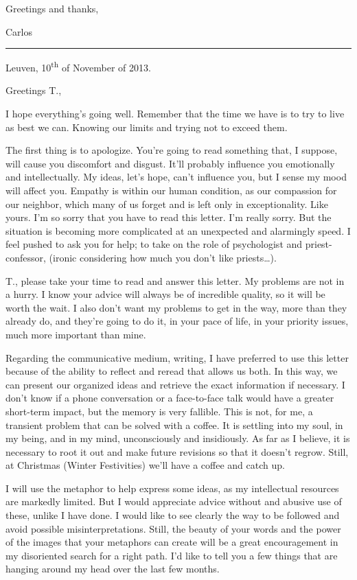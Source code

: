 \documentclass[]{book}
\begin{document}
Greetings and thanks,

Carlos

\begin{center}\rule{0.5\linewidth}{\linethickness}\end{center}

Leuven, 10\textsuperscript{th} of November of 2013.

Greetings T.,

I hope everything's going well. Remember that the time we have is to try to live as best we can. Knowing our limits and trying not to exceed them.

The first thing is to apologize. You're going to read something that, I suppose, will cause you discomfort and disgust. It'll probably influence you emotionally and intellectually. My ideas, let's hope, can't influence you, but I sense my mood will affect you. Empathy is within our human condition, as our compassion for our neighbor, which many of us forget and is left only in exceptionality. Like yours. I'm so sorry that you have to read this letter. I'm really sorry. But the situation is becoming more complicated at an unexpected and alarmingly speed. I feel pushed to ask you for help; to take on the role of psychologist and priest-confessor, (ironic considering how much you don't like priests\ldots).

T., please take your time to read and answer this letter. My problems are not in a hurry. I know your advice will always be of incredible quality, so it will be worth the wait. I also don't want my problems to get in the way, more than they already do, and they're going to do it, in your pace of life, in your priority issues, much more important than mine.

Regarding the communicative medium, writing, I have preferred to use this letter because of the ability to reflect and reread that allows us both. In this way, we can present our organized ideas and retrieve the exact information if necessary. I don't know if a phone conversation or a face-to-face talk would have a greater short-term impact, but the memory is very fallible. This is not, for me, a transient problem that can be solved with a coffee. It is settling into my soul, in my being, and in my mind, unconsciously and insidiously. As far as I believe, it is necessary to root it out and make future revisions so that it doesn't regrow. Still, at Christmas (Winter Festivities) we'll have a coffee and catch up.

I will use the metaphor to help express some ideas, as my intellectual resources are markedly limited. But I would appreciate advice without and abusive use of these, unlike I have done. I would like to see clearly the way to be followed and avoid possible misinterpretations. Still, the beauty of your words and the power of the images that your metaphors can create will be a great encouragement in my disoriented search for a right path.
I'd like to tell you a few things that are hanging around my head over the last few months.
\end{document}
